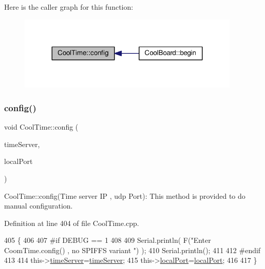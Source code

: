 Here is the caller graph for this function\+:\nopagebreak
\begin{figure}[H]
\begin{center}
\leavevmode
\includegraphics[width=299pt]{d6/d49/class_cool_time_a87c28260c1bc77091162cbcf1ee2e129_icgraph}
\end{center}
\end{figure}
\mbox{\label{class_cool_time_a014656d0d3f74d6391364b92b13e0780}} 
\subsubsection{\texorpdfstring{config()}{config()}\hspace{0.1cm}{\footnotesize\ttfamily [2/2]}}
{\footnotesize\ttfamily void Cool\+Time\+::config (\begin{DoxyParamCaption}\item[{I\+P\+Address}]{time\+Server,  }\item[{unsigned int}]{local\+Port }\end{DoxyParamCaption})}

Cool\+Time\+::config(\+Time server I\+P , udp Port)\+: This method is provided to do manual configuration. 

Definition at line 404 of file Cool\+Time.\+cpp.


\begin{DoxyCode}
405 \{
406 
407 \textcolor{preprocessor}{#if DEBUG == 1 }
408 
409     Serial.println( F(\textcolor{stringliteral}{"Enter CoomTime.config() , no SPIFFS variant "}) );
410     Serial.println();
411 
412 \textcolor{preprocessor}{#endif }
413 
414     this->\hyperlink{class_cool_time_ad2b9858f399108cb440dd1e908916f04}{timeServer}=\hyperlink{class_cool_time_ad2b9858f399108cb440dd1e908916f04}{timeServer};
415     this->\hyperlink{class_cool_time_a2f777da44d7ba678be8185299e9b49d1}{localPort}=\hyperlink{class_cool_time_a2f777da44d7ba678be8185299e9b49d1}{localPort};
416     
417 \} 
\end{DoxyCode}
\mbox{\label{class_cool_time_acd537cd4210d7bde4e1f5c47d2ac0456}} 
